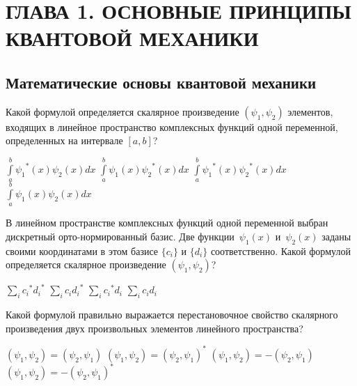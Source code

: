 \documentclass[11pt,a4paper]{exam}
\begin{document}
\tableofcontents

\section{ ГЛАВА 1. ОСНОВНЫЕ ПРИНЦИПЫ КВАНТОВОЙ МЕХАНИКИ }
\subsection{ Математические основы квантовой механики }

\begin{questions}

\question Какой формулой определяется скалярное произведение $( {{\psi }_{1}},{{\psi }_{2}} )$ элементов, входящих в линейное пространство комплексных функций одной переменной, определенных на интервале $[a,b]$?
\begin{choices}
\choice $\int\limits_{a}^{b}{{{\psi }_{1}}^{*}(x){{\psi }_{2}}(x)dx}$      
\choice $\int\limits_{a}^{b}{{{\psi }_{1}}(x){{\psi }_{2}}^{*}(x)dx}$      
\choice $\int\limits_{a}^{b}{{{\psi }_{1}}^{*}(x){{\psi }_{2}}^{*}(x)dx}$     
\choice $\int\limits_{a}^{b}{{{\psi }_{1}}(x){{\psi }_{2}}(x)dx}$
\end{choices}

\question В линейном пространстве комплексных функций одной переменной выбран дискретный орто-нормированный базис. Две функции $\,{{\psi }_{1}}(x)$ и $\,{{\psi }_{2}}(x)$ заданы своими координатами в этом базисе $\{{{c}_{i}}\}$ и $\{{{d}_{i}}\}$ соответственно. Какой формулой определяется скалярное произведение $\left( {{\psi }_{1}},{{\psi }_{2}} \right)$?
\begin{choices}
\choice $\sum\limits_{i}{{{c}_{i}}^{*}{{d}_{i}}^{*}}$    
\choice $\sum\limits_{i}{{{c}_{i}}{{d}_{i}}^{*}}$     
\choice $\sum\limits_{i}{{{c}_{i}}^{*}{{d}_{i}}}$     
\choice $\sum\limits_{i}{{{c}_{i}}{{d}_{i}}}$
\end{choices}

\question Какой формулой правильно выражается перестановочное свойство скалярного произведения двух произвольных элементов линейного пространства?
\begin{choices}
\choice $\left( {{\psi }_{1}},{{\psi }_{2}} \right)=\left( {{\psi }_{2}},{{\psi }_{1}} \right)$     
\choice $\left( {{\psi }_{1}},{{\psi }_{2}} \right)={{\left( {{\psi }_{2}},{{\psi }_{1}} \right)}^{*}}$          
\choice $\left( {{\psi }_{1}},{{\psi }_{2}} \right)=-\left( {{\psi }_{2}},{{\psi }_{1}} \right)$   
\choice $\left( {{\psi }_{1}},{{\psi }_{2}} \right)=-{{\left( {{\psi }_{2}},{{\psi }_{1}} \right)}^{*}}$
\end{choices}


\end{questions}
\end{document}

